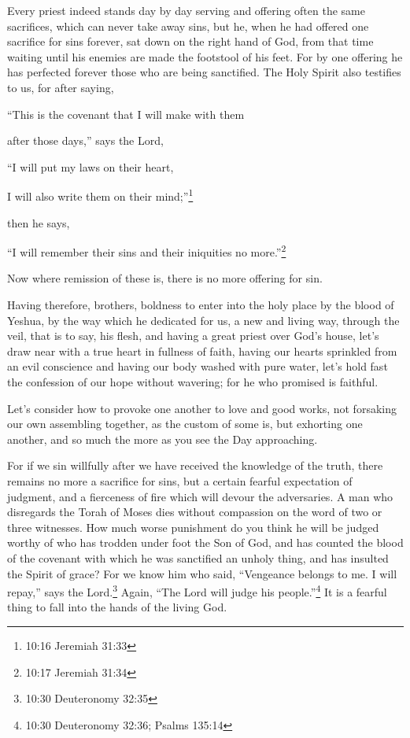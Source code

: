 \myverse{}Every priest indeed stands day by day serving and offering often
the same sacrifices, which can never take away sins,
\myverse{}but he, when he had offered one sacrifice for sins forever, sat down on the
right hand of God,
\myverse{}from that time waiting until his enemies are made the footstool of his feet.
\myverse{}For by one offering he has perfected forever those who are being sanctified.
\myverse{}The Holy Spirit also testifies to us, for after saying,

\myverse{}“This is the covenant that I will make with them

after those days,” says the Lord,

“I will put my laws on their heart,

I will also write them on their mind;”\footnote{10:16 Jeremiah 31:33}

then he says,

\myverse{}“I will remember their sins and their iniquities no more.”\footnote{10:17 Jeremiah 31:34}

\myverse{}Now where remission of these is, there is no more offering for
sin.

\myverse{}Having therefore, brothers, boldness to enter into the holy
place by the blood of Yeshua,
\myverse{}by the way which he dedicated for us, a new and living way, through the veil,
that is to say, his flesh,
\myverse{}and having a great priest over God’s house,
\myverse{}let’s draw near with a true heart in fullness of faith, having our hearts
sprinkled from an evil conscience and having our body washed with pure water,
\myverse{}let’s hold fast the confession of our hope without wavering; for he who promised
is faithful.

\myverse{}Let’s consider how to provoke one another to love and good works,
\myverse{}not forsaking our own assembling together, as the custom of some is, but
exhorting one another, and so much the more as you see the Day approaching.

\myverse{}For if we sin willfully after we have received the knowledge
of the truth, there remains no more a sacrifice for sins,
\myverse{}but a certain fearful expectation of judgment, and a fierceness of fire which
will devour the adversaries.
\myverse{}A man who disregards the Torah of Moses dies without compassion on the word
of two or three witnesses.
\myverse{}How much worse punishment do you think he will be judged worthy of who has
trodden under foot the Son of God, and has counted the blood of the covenant with which he was sanctified
an unholy thing, and has insulted the Spirit of grace?
\myverse{}For we know him who said, “Vengeance belongs to me. I will repay,” says the
Lord.\footnote{10:30 Deuteronomy 32:35} Again, “The Lord will judge his people.”\footnote{10:30 Deuteronomy 32:36;
	Psalms 135:14}
\myverse{}It is a fearful thing to fall into the hands of the living God.

